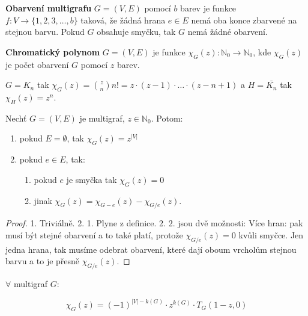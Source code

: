 \begin{definice}
	\textbf{Obarvení multigrafu} $G=(V,E)$ pomocí $b$ barev je funkce $f: V \to \{1,2,3, \dots ,b\}$ taková, že žádná hrana $e \in E$ nemá oba konce zbarvené na stejnou barvu. Pokud $G$ obsahuje smyčku, tak $G$ nemá žádné obarvení.
\end{definice}

\begin{definice}
	\textbf{Chromatický polynom} $G= (V,E)$ je funkce $\chi_{G}(z): \mathbb{N}_{0} \to \mathbb{N}_{0}$, kde $\chi_{G}(z)$ je počet obarvení $G$ pomocí $z$ barev.
\end{definice}

\begin{cvic}
	$G = K_{n}$ tak $\chi_{G}(z) = \binom{z}{n}n! = z \cdot (z-1) \cdot \dots \cdot (z - n +1)$ a $H = \bar{K_{n}}$ tak $\chi_{H}(z) = z^{n}$.
\end{cvic}

\begin{tvrz}
	Nechť $G = (V,E)$ je multigraf, $z \in \mathbb{N}_{0}$. Potom:
	
	\begin{enumerate}
		\item pokud $E = \emptyset$, tak $\chi_{G}(z) = z^{|V|}$
		\item pokud $e \in E$, tak:
		\begin{enumerate}
			\item pokud $e$ je smyčka tak $\chi_{G}(z) = 0$
			\item jinak $\chi_{G}(z) = \chi_{G-e}(z) - \chi_{G/e}(z)$.
		\end{enumerate}
	\end{enumerate}
\end{tvrz}

\begin{proof}
	1. Triviálně. 2. 1. Plyne z definice. 2. 2. jsou dvě možnosti: Více hran: pak musí být stejné obarvení a to také platí, protože $\chi_{G/e}(z) = 0$ kvůli smyčce. Jen jedna hrana, tak musíme odebrat obarvení, které dají oboum vrcholům stejnou barvu a to je přesně $\chi_{G/e}(z)$.
\end{proof}

\begin{tvrz}
	$\forall$ multigraf $G$:
	
	$$
	\chi_{G}(z) = (-1)^{|V| - k(G)} \cdot z^{k(G)} \cdot T_{G}(1-z,0)
	$$
\end{tvrz}

